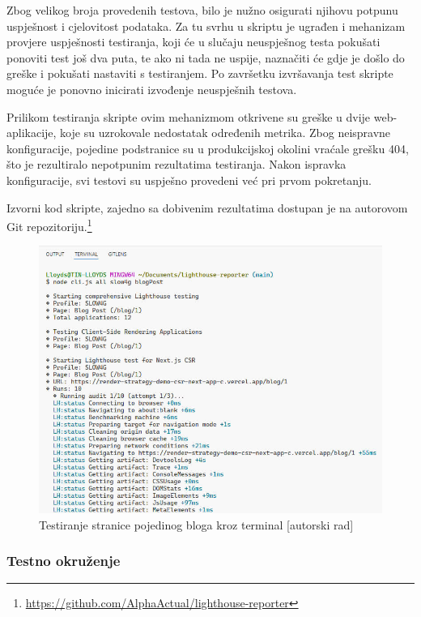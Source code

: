 \bigskip

Zbog velikog broja provedenih testova, bilo je nužno osigurati njihovu potpunu uspješnost i cjelovitost podataka. Za tu svrhu u skriptu je ugrađen i mehanizam provjere uspješnosti testiranja, koji će u slučaju neuspješnog testa pokušati ponoviti test još dva puta, te ako ni tada ne uspije, naznačiti će gdje je došlo do greške i pokušati nastaviti s testiranjem. Po završetku izvršavanja test skripte moguće je ponovno inicirati izvođenje neuspješnih testova.

\bigskip

Prilikom testiranja skripte ovim mehanizmom otkrivene su greške u dvije web-aplikacije, koje su uzrokovale nedostatak određenih metrika. Zbog neispravne konfiguracije, pojedine podstranice su u produkcijskoj okolini vraćale grešku 404, što je rezultiralo nepotpunim rezultatima testiranja. Nakon ispravka konfiguracije, svi testovi su uspješno provedeni već pri prvom pokretanju.

\bigskip

Izvorni kod skripte, zajedno sa dobivenim rezultatima dostupan je na autorovom Git repozitoriju.\footnote{\url{https://github.com/AlphaActual/lighthouse-reporter}}

\begin{figure}[H]
    \centering
    \includegraphics[width=\textwidth]{slike/testiranje-aplikacije.jpg}
    \caption{Testiranje stranice pojedinog bloga kroz terminal [autorski rad]}
    \label{fig:testiranje-aplikacije}
\end{figure}

\subsubsection{Testno okruženje}

